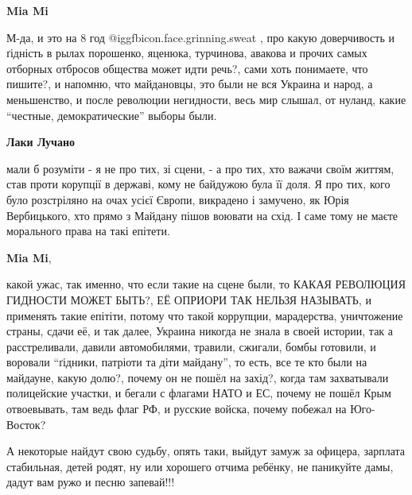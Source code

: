 \begin{itemize}
\begin{itemize}
\textbf{Mia Mi} 

М-да, и это на 8 год  @igg{fbicon.face.grinning.sweat} , про какую доверчивость и ґідність в рылах порошенко,
яценюка, турчинова, авакова и прочих самых отборных отбросов общества может
идти речь?, сами хоть понимаете, что пишите?, и напомню, что майдановцы, это
были не вся Украина и народ, а меньшенство, и после революции негидности, весь
мир слышал, от нуланд, какие \enquote{честные, демократические} выборы были.

\textbf{Лаки Лучано} 

мали б розуміти - я не про тих, зі сцени, - а про тих, хто важачи своїм життям,
став проти корупції в державі, кому не байдужою була її доля. Я про тих, кого
було розстріляно на очах усієї Європи, викрадено і замучено, як Юрія
Вербицького, хто прямо з Майдану пішов воювати на схід. І саме тому не маєте
морального права на такі епітети.

\textbf{Mia Mi}, 

какой ужас, так именно, что если такие на сцене были, то КАКАЯ РЕВОЛЮЦИЯ
ГИДНОСТИ МОЖЕТ БЫТЬ?, ЕЁ ОПРИОРИ ТАК НЕЛЬЗЯ НАЗЫВАТЬ, и применять такие
епітіти, потому что такой коррупции, марадерства, уничтожение страны, сдачи её,
и так далее, Украина никогда не знала в своей истории, так а расстреливали,
давили автомобилями, травили, сжигали, бомбы готовили, и воровали  \enquote{ґідники,
патріоти та діти майдану}, то есть, все те кто были на майдауне, какую долю?,
почему он не пошёл на захід?, когда там захватывали полицейские участки, и
бегали с флагами НАТО и ЕС, почему не пошёл Крым отвоевывать, там ведь флаг РФ,
и русские войска, почему побежал на Юго-Восток?

\end{itemize} %


А некоторые найдут свою судьбу, опять таки, выйдут замуж за офицера, зарплата
стабильная, детей родят, ну или хорошего отчима ребёнку, не паникуйте дамы,
дадут вам ружо и песню запевай!!!

\end{itemize} %
